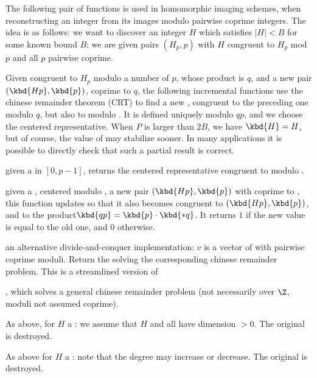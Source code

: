 \medskip

The following pair of functions is used in homomorphic imaging schemes,
when reconstructing an integer from its images modulo pairwise coprime
integers. The idea is as follows: we want to discover an integer $H$ which
satisfies $|H| < B$ for some known bound $B$; we are given pairs $(H_p, p)$
with $H$ congruent to $H_p$ mod $p$ and all $p$ pairwise coprime.

Given  congruent to $H_p$ modulo a number of $p$, whose product is
$q$, and a new pair $(\kbd{Hp}, \kbd{p})$,  coprime to $q$, the
following incremental functions use the chinese remainder theorem (CRT) to
find a new , congruent to the preceding one modulo $q$, but also to
 modulo . It is defined uniquely modulo $qp$, and we choose
the centered representative. When $P$ is larger than $2B$, we have $\kbd{H} =
H$, but of course, the value of  may stabilize sooner. In many
applications it is possible to directly check that such a partial result is
correct.

 given a   in
$[0, p-1]$, returns the centered representative  congruent to 
modulo .

given a  , centered modulo , a new pair $(\kbd{Hp},
\kbd{p})$ with  coprime to , this function updates  so
that it also becomes congruent to $(\kbd{Hp}, \kbd{p})$, and  to the
product$\kbd{qp} = \kbd{p} \cdot \kbd{*q}$. It returns $1$ if the new value
is equal to the old one, and $0$ otherwise.

 an alternative divide-and-conquer
implementation: $v$ is a vector of  with pairwise coprime moduli.
Return the  solving the corresponding chinese remainder problem.
This is a streamlined version of

, which solves a general chinese remainder problem
(not necessarily over $\Z$, moduli not assumed coprime).

As above, for $H$ a : we assume that $H$ and all  have
dimension $> 0$. The original  is destroyed.



As above for $H$ a : note that the degree may increase or decrease.
The original  is destroyed.

